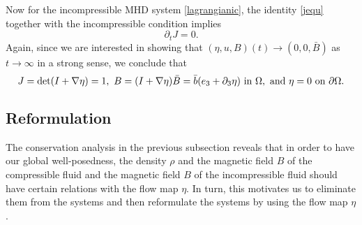 \documentclass[a4paper,reqno,11pt]{amsart}
\numberwithin{equation}{section}
\begin{document}
Now for the incompressible MHD system \eqref{lagrangianic}, the identity \eqref{jequ} together with the incompressible condition implies
\begin{equation}
\partial_t J =0.
\end{equation}
Again, since we are interested in showing that $(\eta,u,B)(t)\rightarrow (0,0,\bar B)$ as $t\rightarrow\infty$ in a strong sense, we conclude that
\begin{equation}\label{imp2}
J={\rm det} (I+\nabla\eta)=1,\ B =  (I+\nabla \eta)\bar B= \bar b(e_3+{\partial}_3 \eta)  \text{ in }\Omega, \text{ and }\eta=0 \text{ on }{\partial}\Omega.
\end{equation}

\subsection{Reformulation}

The conservation analysis in the previous subsection reveals that in order to have our global well-posedness, the density $\rho$ and the magnetic field $B$ of the compressible fluid and the magnetic field $B$ of the incompressible fluid should have certain relations with the flow map $\eta$. In turn, this motivates us to eliminate them from the systems and then reformulate the systems by using the flow map $\eta$.
\end{document}
